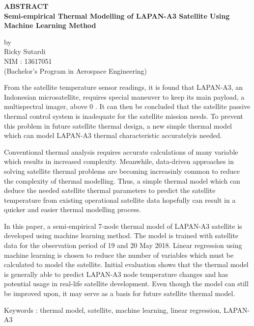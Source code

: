 \begin{center}
       \Large
       \textbf{ABSTRACT} \\
        \vspace{1.5cm}
        \large
        \textbf{Semi-empirical Thermal Modelling of LAPAN-A3 Satellite Using Machine Learning Method}\\
        
        \vspace{1.5cm}
        
        by\\
        Ricky Sutardi\\
        NIM : 13617051\\
        (Bachelor's Program in Aerospace Engineering)\\
        \vspace{1.5cm}
\end{center}

From the satellite temperature sensor readings, it is found that LAPAN-A3, an
Indonesian microsatellite, requires special maneuver to keep its main payload,
a multispectral imager, above 0 \degree. It can then be concluded that the
satellite passive thermal control system is inadequate for the satellite
mission needs. To prevent this problem in future satellite thermal design, a
new simple thermal model which can model LAPAN-A3 thermal characteristic accuratelyis needed.

Conventional thermal analysis requires accurate calculations of many variable
which results in increased complexity. Meanwhile, data-driven approaches in
solving satellite thermal problems are becoming increasinly common to reduce
the complexity of thermal modelling. Thus, a simple thermal model which can
deduce the needed satellite thermal parameters to predict the satellite
temperature from existing operational satellite data hopefully can result in a
quicker and easier thermal modelling process.

In this paper, a semi-empirical 7-node thermal model of LAPAN-A3 satellite is
developed using machine learning method. The model is trained with satellite
data for the observation period of 19 and 20 May 2018. Linear regression using
machine learning is chosen to reduce the number of variables which must be
calculated to model the satellite. Initial evaluation shows that the thermal
model is generally able to predict LAPAN-A3 node temperature changes and has
potential usage in real-life satellite development. Even though the model can
still be improved upon, it may serve as a basis for future satellite thermal
model.

\vspace{1.0cm}
\noindent 
Keywords : thermal model, satellite, machine learning, linear regression, LAPAN-A3 
